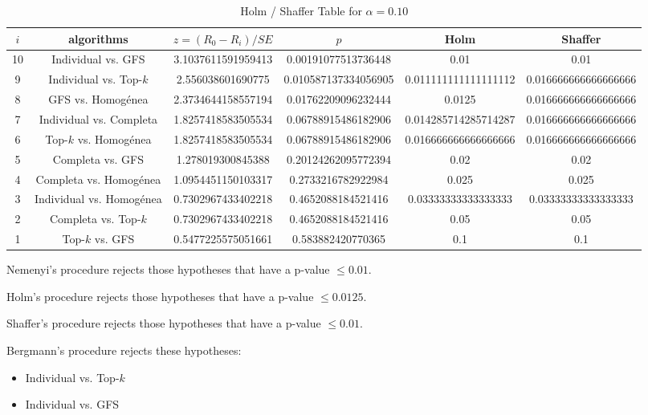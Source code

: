 \documentclass[a4paper,10pt]{article}
\begin{document}
\begin{landscape}
\begin{table}[!htp]
\centering\tiny
\caption{Holm / Shaffer Table for $\alpha=0.10$}
\begin{tabular}{cccccc}
$i$&algorithms&$z=(R_0 - R_i)/SE$&$p$&Holm&Shaffer\\
\hline
10&Individual vs. GFS&3.1037611591959413&0.00191077513736448&0.01&0.01\\
9&Individual vs. Top-$k$&2.556038601690775&0.010587137334056905&0.011111111111111112&0.016666666666666666\\
8&GFS vs. Homogénea&2.3734644158557194&0.01762209096232444&0.0125&0.016666666666666666\\
7&Individual vs. Completa&1.8257418583505534&0.06788915486182906&0.014285714285714287&0.016666666666666666\\
6&Top-$k$ vs. Homogénea&1.8257418583505534&0.06788915486182906&0.016666666666666666&0.016666666666666666\\
5&Completa vs. GFS&1.278019300845388&0.20124262095772394&0.02&0.02\\
4&Completa vs. Homogénea&1.0954451150103317&0.2733216782922984&0.025&0.025\\
3&Individual vs. Homogénea&0.7302967433402218&0.4652088184521416&0.03333333333333333&0.03333333333333333\\
2&Completa vs. Top-$k$&0.7302967433402218&0.4652088184521416&0.05&0.05\\
1&Top-$k$ vs. GFS&0.5477225575051661&0.583882420770365&0.1&0.1\\
\hline
\end{tabular}
\end{table}
Nemenyi's procedure rejects those hypotheses that have a p-value $\le0.01$.


Holm's procedure rejects those hypotheses that have a p-value $\le0.0125$.


Shaffer's procedure rejects those hypotheses that have a p-value $\le0.01$.


Bergmann's procedure rejects these hypotheses:


\begin{itemize}


\item Individual vs. Top-$k$
\item Individual vs. GFS
\end{itemize}



\end{landscape}
\end{document}
